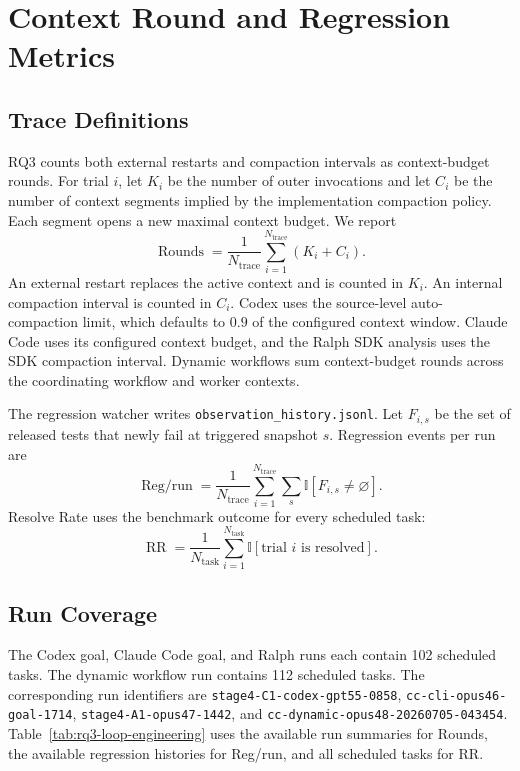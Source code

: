 \section{Context Round and Regression Metrics}\label{app:compaction-internals}

\subsection{Trace Definitions}\label{app:loop-compaction-metrics}

RQ3 counts both external restarts and compaction intervals as context-budget rounds. For trial $i$, let $K_i$ be the number of outer invocations and let $C_i$ be the number of context segments implied by the implementation compaction policy. Each segment opens a new maximal context budget. We report
\begin{equation}
\operatorname{Rounds}=\frac{1}{N_{\mathrm{trace}}}\sum_{i=1}^{N_{\mathrm{trace}}}(K_i+C_i).
\end{equation}
An external restart replaces the active context and is counted in $K_i$. An internal compaction interval is counted in $C_i$. Codex uses the source-level auto-compaction limit, which defaults to $0.9$ of the configured context window. Claude Code uses its configured context budget, and the Ralph SDK analysis uses the SDK compaction interval. Dynamic workflows sum context-budget rounds across the coordinating workflow and worker contexts.

The regression watcher writes \texttt{observation\_history.jsonl}. Let $F_{i,s}$ be the set of released tests that newly fail at triggered snapshot $s$. Regression events per run are
\begin{equation}
\operatorname{Reg/run}=\frac{1}{N_{\mathrm{trace}}}\sum_{i=1}^{N_{\mathrm{trace}}}\sum_s \mathbb{I}[F_{i,s}\neq\varnothing].
\end{equation}
Resolve Rate uses the benchmark outcome for every scheduled task:
\begin{equation}
\operatorname{RR}=\frac{1}{N_{\mathrm{task}}}\sum_{i=1}^{N_{\mathrm{task}}}\mathbb{I}[\text{trial }i\text{ is resolved}].
\end{equation}

\subsection{Run Coverage}

The Codex goal, Claude Code goal, and Ralph runs each contain 102 scheduled tasks. The dynamic workflow run contains 112 scheduled tasks. The corresponding run identifiers are \texttt{stage4-C1-codex-gpt55-0858}, \texttt{cc-cli-opus46-goal-1714}, \texttt{stage4-A1-opus47-1442}, and \texttt{cc-dynamic-opus48-20260705-043454}. Table~\ref{tab:rq3-loop-engineering} uses the available run summaries for Rounds, the available regression histories for Reg/run, and all scheduled tasks for RR.
